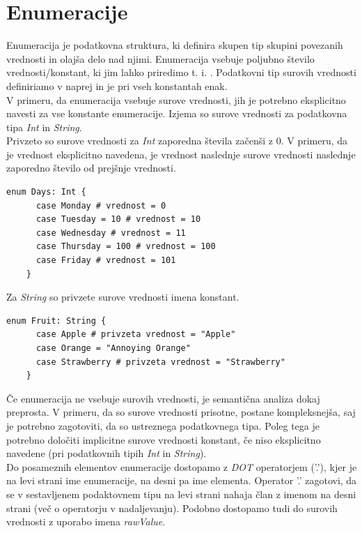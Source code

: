 \documentclass[a4paper, 12p]{book}
\begin{document}
\section{Enumeracije}

Enumeracija je podatkovna struktura, ki definira skupen tip skupini povezanih vrednosti in olajša delo nad njimi. Enumeracija vsebuje poljubno število vrednosti/konstant, ki jim lahko priredimo t. i. . Podatkovni tip surovih vrednosti definiriamo v naprej in je pri vseh konstantah enak. \\
\indent V primeru, da enumeracija vsebuje surove vrednosti, jih je potrebno eksplicitno navesti za vse konstante enumeracije. Izjema so surove vrednosti za podatkovna tipa \textit{Int} in \textit{String}. \\
\indent Privzeto so surove vrednosti za \textit{Int} zaporedna števila začenši z 0. V primeru, da je vrednost eksplicitno navedena, je vrednost naslednje surove vrednosti naslednje zaporedno število od prejšnje vrednosti.

\begin{lstlisting}[caption={Enumeracija s surovimi vrednostmi tipa Int.}, captionpos=b]
	enum Days: Int {
	  case Monday # vrednost = 0
	  case Tuesday = 10 # vrednost = 10
	  case Wednesday # vrednost = 11
	  case Thursday = 100 # vrednost = 100
	  case Friday # vrednost = 101
	}
\end{lstlisting}

\indent Za \textit{String} so privzete surove vrednosti imena konstant.

\begin{lstlisting}[caption={Enumeracija s surovimi vrednostmi tipa String.}, captionpos=b, label={lst:fruitEnumeration}]
	enum Fruit: String {
	  case Apple # privzeta vrednost = "Apple"
	  case Orange = "Annoying Orange"
	  case Strawberry # privzeta vrednost = "Strawberry"
	}
\end{lstlisting}

\indent Če enumeracija ne vsebuje surovih vrednosti, je semantična analiza dokaj preprosta. V primeru, da so surove vrednosti prisotne, postane kompleksnejša, saj je potrebno zagotoviti, da so ustreznega podatkovnega tipa. Poleg tega je potrebno določiti implicitne surove vrednosti konstant, če niso eksplicitno navedene (pri podatkovnih tipih \textit{Int} in \textit{String}). \\
\indent Do posameznih elementov enumeracije dostopamo z \textit{DOT} operatorjem ('.'), kjer je na levi strani ime enumeracije, na desni pa ime elementa. Operator '.' zagotovi, da se v sestavljenem podaktovnem tipu na levi strani nahaja član z imenom na desni strani (več o operatorju v nadaljevanju). Podobno dostopamo tudi do surovih vrednosti z uporabo imena \textit{rawValue}. 
\end{document}

